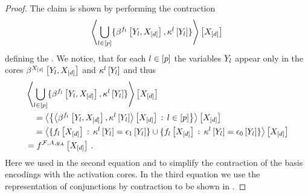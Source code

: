 \begin{proof}
    The claim is shown by performing the contraction
    \begin{align*}
        \left\langle 
            \bigcup_{l\in[p]}\{\beta^{f_{l}}\left[Y_{l},X_{[d]}\right],\kappa^{l}\left[Y_{l}\right]\}
        \right\rangle \left[ X_{[d]} \right]
    \end{align*}
    defining the \HardLogicNetwork{}.
    We notice, that for each $l\in[p]$ the variables $Y_{l}$ appear only in the cores $\beta^{X_{[d]}}\left[Y_{l},X_{[d]}\right]$ and $\kappa^{l}\left[Y_{l}\right]$ and thus
    \begin{align*}
        & \left\langle 
            \bigcup_{l\in[p]}\{\beta^{f_{l}}\left[Y_{l},X_{[d]}\right],\kappa^{l}\left[Y_{l}\right]\}
        \right\rangle \left[ X_{[d]} \right] \\
        & \quad =    \left\langle 
            \left\{
            \left\langle \beta^{f_{l}}\left[Y_{l},X_{[d]}\right],\kappa^{l}\left[Y_{l}\right]\right\rangle \left[ X_{[d]} \right]
            \,:\,l\in[p]\right\}
        \right\rangle \left[ X_{[d]} \right] \\
        & \quad = \left\langle 
            \{
            f_{l}\left[X_{[d]}\right]
            \,:\,\kappa^{l}\left[Y_{l}\right] = \epsilon_1\left[Y_{l}\right]
            \}
            \cup
            \{
            f_{l}\left[X_{[d]}\right]
            \,:\,\kappa^{l}\left[Y_{l}\right] = \epsilon_0\left[Y_{l}\right]
            \}
        \right\rangle \left[ X_{[d]} \right] \\
        & = f^{\mathcal{F},A,y_{A}}\left[X_{[d]}\right] \, .
    \end{align*}
    Here we used in the second equation  and  to simplify the contraction of the basis encodings with the activation cores.
    In the third equation we use the representation of conjunctions by contraction to be shown in .
\end{proof}

